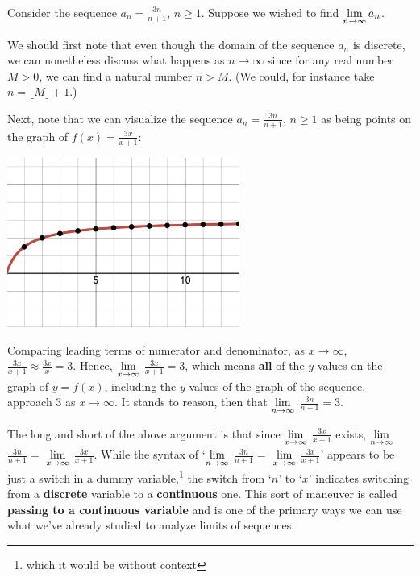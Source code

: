 \documentclass{ximera}
\begin{document}
Consider the sequence $a_{n} = \frac{3n}{n+1}$, $n \geq 1$. Suppose we wished to find $\ds{\lim_{n \rightarrow \infty} a_{n}}$.

\medskip

We should first note that even though the domain of the sequence $a_{n}$ is discrete, we can nonetheless discuss what happens as $n \rightarrow \infty$ since for any real number $M>0$, we can find a natural number $n > M$.  (We could, for instance take $n  = \lfloor M \rfloor + 1$.)  

\medskip

Next, note that we can visualize  the sequence $a_{n} = \frac{3n}{n+1}$, $n \geq 1$ as being points on the graph of $f(x) = \frac{3x}{x+1}$:

\begin{center}

\includegraphics[width=3in]{./SequenceGraphics/sequenceoncurve.png}

\end{center}

Comparing leading terms of numerator and denominator, as $x \rightarrow \infty$, $\frac{3x}{x+1} \approx \frac{3x}{x} = 3$.   Hence,  $\ds{\lim_{x \rightarrow \infty}}$ $\frac{3x}{x+1} = 3$, which means \textbf{all} of the $y$-values on the graph of $y = f(x)$, including the $y$-values of the graph of the sequence,  approach $3$ as $x \rightarrow \infty$.  It stands to reason, then that $\ds{\lim_{n \rightarrow \infty}}$  $\frac{3n}{n+1} = 3$.


\medskip

The long and short of the above argument is that since $\ds{\lim_{x\rightarrow \infty}}$ $\frac{3x}{x+1}$ exists, $\ds{\lim_{n \rightarrow \infty}}$   $\frac{3n}{n+1} = $ $\ds{\lim_{x \rightarrow \infty}}$ $\frac{3x}{x+1}$.  While the syntax of `$\ds{\lim_{n \rightarrow \infty}}$  $\frac{3n}{n+1} =$ $\ds{\lim_{x \rightarrow \infty}}$  $\frac{3x}{x+1}$' appears to be just a switch in a dummy variable,\footnote{which it would be without context}  the switch from `$n$' to `$x$' indicates switching from a \textbf{discrete} variable to a \textbf{continuous} one. This sort of maneuver is called \textbf{passing to a continuous variable} and is one of the primary ways we can use what we've already studied to analyze limits of sequences.  
\end{document}
